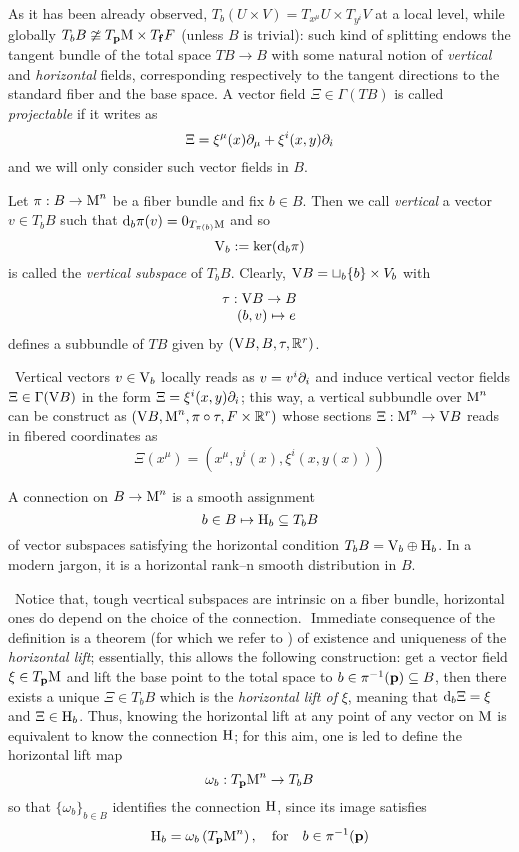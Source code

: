 As it has been already observed, $T_b(U\times V)=T_{x^\mu} U\times T_{y^i} V$ at a local level, while globally $T_bB\ncong T_{\mathbf{p}}\text{\normalfont M}\times T_{\mathbf{f}} F$ (unless $B$ is trivial): such kind of splitting endows the tangent bundle of the total space $TB\to B$ with some natural notion of \emph{vertical} and \emph{horizontal} fields, corresponding respectively to the tangent directions to the standard fiber and the base space. A vector field $\Xi\in\Gamma(TB)$ is called \emph{projectable} if it writes as
$$\Xi=\xi^\mu(x)\partial_\mu+\xi^i(x,y)\partial_i$$
and we will only consider such vector fields in $B$.
\begin{defi}\label{vertSubspace}
    Let $\pi:B\to\text{\normalfont M}^n$ be a fiber bundle and fix $b\in B$. Then we call \emph{vertical} a vector $v\in T_bB$ such that $\text{\normalfont d}_b\pi(v)=0_{T_{\pi(b)}\text{\normalfont M}}$ and so
    $$\text{\normalfont V}_b:=\ker(\text{\normalfont d}_b\pi)$$
    is called the \emph{vertical subspace} of $T_bB$. Clearly, $\text{\normalfont V} B=\sqcup_b\{b\}\times V_b$ with
    $$\begin{matrix}
        \tau:\text{\normalfont V} B\to B\\
        \quad(b,v)\mapsto e
    \end{matrix}$$
    defines a subbundle of $TB$ given by $(\text{\normalfont V} B,B,\tau,\mathbb{R}^r)$.
\end{defi}
\,\newline
Vertical vectors $v\in\text{\normalfont V}_b$ locally reads as $v=v^i\partial_i$ and induce vertical vector fields $\Xi\in\Gamma(\text{\normalfont V} B)$ in the form $\Xi=\xi^i(x,y)\partial_i$; this way, a vertical subbundle over $\text{\normalfont M}^n$ can be construct as
$(\text{\normalfont V} B,\text{\normalfont M}^n,\pi\circ\tau,F\times\mathbb{R}^r)$ whose sections $\Xi:\text{\normalfont M}^n\to \text{\normalfont V} B$ reads in fibered coordinates as 
$$\Xi(x^\mu)=\left(x^\mu,y^i(x),\xi^i(x,y(x))\right)
$$

\begin{defi}[Connection]
    A connection on $B\to\text{\normalfont M}^n$ is a smooth assignment 
    $$b\in B\mapsto\text{\normalfont H}_b\subseteq T_bB$$
    of vector subspaces satisfying the horizontal condition $T_bB=\text{\normalfont V}_b\oplus\text{\normalfont H}_b$. In a modern jargon, it is a horizontal rank--n smooth distribution in $B$.
\end{defi}
\,\newline
Notice that, tough vecrtical subspaces are intrinsic on a fiber bundle, horizontal ones do depend on the choice of the connection.\,\, Immediate consequence of the definition is a theorem (for which we refer to \cite{gockeler}) of existence and uniqueness of the \emph{horizontal lift}; essentially, this allows the following construction: get a vector field $\xi\in T_{\mathbf{p}}\text{\normalfont M}$ and lift the base point to the total space to $b\in\pi^{-1}(\mathbf{p})\subseteq B$, then there exists a unique $\Xi\in T_bB$ which is the \emph{horizontal lift of} $\xi$, meaning that $\text{\normalfont d}_b\Xi=\xi$ and $\Xi\in\text{\normalfont H}_b$. Thus, knowing the horizontal lift at any point of any vector on $\text{\normalfont M}$ is equivalent to know the connection $\text{\normalfont H}$; for this aim, one is led to define the horizontal lift map 
$$\omega_b:T_{\mathbf{p}}\text{\normalfont M}^n\to T_bB$$
so that $\{\omega_b\}_{b\in B}$ identifies the connection $\text{\normalfont H}$, since its image satisfies
$$\text{\normalfont H}_b=\omega_b\left(T_{\mathbf{p}}\text{\normalfont M}^n\right),\quad\text{for}\quad b\in\pi^{-1}(\mathbf{p})$$

